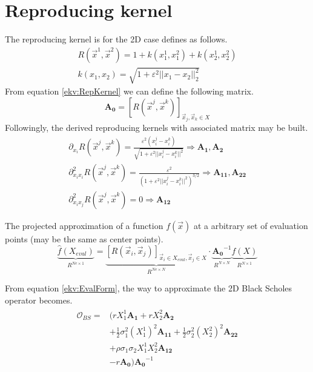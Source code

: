 \documentclass[a4paper]{article}      %
\begin{document}
\section*{Reproducing kernel}
The reproducing kernel is for the 2D case defines as follows.
\begin{equation}
	\begin{gathered}
	R(\vec{x}^1, \vec{x}^2) = 1 + k({x}^1_1, {x}^2_1) + k({x}^1_2, {x}^2_2) \\
	k(x_1, x_2) = \sqrt{1 + \varepsilon^2 ||x_1 - x_2||_2^2}
	\end{gathered}
	\label{ekv:RepKernel}
\end{equation}
From equation \ref{ekv:RepKernel} we can define the following matrix.
\begin{equation}
\mathbf{A_0} = \left[R(\vec{x}^j, \vec{x}^k)\right] _{\vec{x}_j,\vec{x}_k \in X} 
\end{equation}
Followingly, the derived reproducing kernels with associated matrix may be built.
\begin{equation}
	\begin{gathered}
	\partial_{x_i} R(\vec{x}^j, \vec{x}^k) = \frac{\varepsilon^2(x_i^j - x_i^k)}{\sqrt{1 + \varepsilon^2||x_i^j - x_i^k||^2}} \Rightarrow  \mathbf{A_1}, \mathbf{A_2} \\[5pt]
	\partial^2_{x_ix_i} R(\vec{x}^j, \vec{x}^k) = \frac{\varepsilon^2}{(1 + \varepsilon^2||x_i^j - x_i^k||^2)^{3/2}} \Rightarrow  \mathbf{A_{11}}, \mathbf{A_{22}} \\[5pt]
	\partial^2_{x_ix_j} R(\vec{x}^j, \vec{x}^k) = 0  \Rightarrow \mathbf{A_{12}} 
	\end{gathered}
\end{equation}

The projected approximation of a function $f(\vec{x})$ at a arbitrary set of evaluation points (may be the same as center points).
\begin{equation}
	\underbrace{\hat{f}(X_{eval})}_{R^{Ne \times 1}} =
	\underbrace{ 
	\left[R(\vec{x}_i, \vec{x}_j)  				\right]_{\vec{x}_i \in X_{eval}, \vec{x}_j \in X} 	}_{R^{Ne \times N}}	
	\cdot 
	\underbrace{
	\mathbf{A_0}^{-1}
	}_{R^{N\times N}}
	\underbrace{ 
	f(X)
	}_{R^{N \times 1 }}
	\label{ekv:EvalForm}
	\end{equation} 

From equation \ref{ekv:EvalForm}, the way to approximate the 2D Black Scholes operator becomes.
\begin{gather}
\begin{aligned}
 \mathcal{O}_{BS} =& ( rX_1^1 \mathbf{A_1} + rX_2^2 \mathbf{A_2} \\
&+ \frac{1}{2} \sigma_1^2 (X_1^1)^2 \mathbf{A_{11}} 
+ \frac{1}{2} \sigma_2^2 (X_2^2)^2 \mathbf{A_{22}} \\
&+ \rho \sigma_1 \sigma_2 X_1^1 X_2^2 \mathbf{A_{12}} \\
& - r\mathbf{A_0} ) \mathbf{A_0}^{-1} \\
\end{aligned}
\end{gather}   
\end{document}
